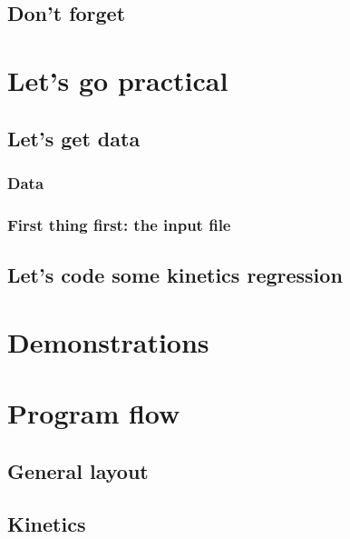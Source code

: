\documentclass[twoside]{report}
\begin{document}
\section{\GRVY}

\section{Don't forget \Doxygen}
\label{dox}


\chapter{Let's go practical}
\chaptermark{\ANTIOCHPrac}
\label{Antioch:practice}

\section{Let's get data}

\subsection{Data}
\label{kin:data}


\subsection{First thing first: the input file}


\section{Let's code some kinetics regression}


\appendix
\chapter{Demonstrations}
\label{demo}


\chapter{Program flow}
\label{progflow}

\section{General layout}
\label{progflow:general}


\section{Kinetics}
\label{progflow:kinetics}

\end{document}
